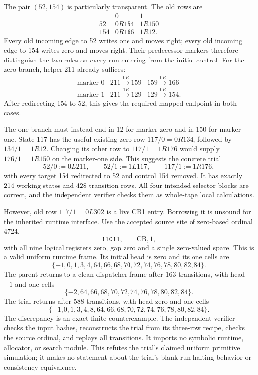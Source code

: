 The pair $(52,154)$ is particularly transparent. The old rows are
\[
\begin{array}{c|cc}
 &0&1\\\hline
52&0R154&1R150\\
154&0R166&1R12.
\end{array}
\]
Every old incoming edge to 52 writes one and moves right; every old incoming edge to 154 writes zero and moves right. Their predecessor markers therefore distinguish the two roles on every run entering from the initial control. For the zero branch, helper 211 already suffices:
\[
\begin{array}{c|cc}
\text{marker }0&211\xrightarrow{0R}159&159\xrightarrow{0R}166\\
\text{marker }1&211\xrightarrow{1R}129&129\xrightarrow{0R}154.
\end{array}
\]
After redirecting 154 to 52, this gives the required mapped endpoint in both cases.

The one branch must instead end in 12 for marker zero and in 150 for marker one. State 117 has the useful existing zero row $117/0=0R134$, followed by $134/1=1R12$. Changing its other row to $117/1=1R176$ would supply $176/1=1R150$ on the marker-one side. This suggests the concrete trial
\[
 52/0:=0L211,\qquad
 52/1:=1L117,\qquad
 117/1:=1R176,
\]
with every target 154 redirected to 52 and control 154 removed. It has exactly 214 working states and 428 transition rows. All four intended selector blocks are correct, and the independent verifier checks them as whole-tape local calculations.

However, old row $117/1=0L302$ is a live CB1 entry. Borrowing it is unsound for the inherited runtime interface. Use the accepted source site of zero-based ordinal 4724,
\[
 \texttt{11011},\qquad\mathrm{CB},1,
\]
with all nine logical registers zero, gap zero and a single zero-valued spare. This is a valid uniform runtime frame. Its initial head is zero and its one cells are
\[
 \{-1,0,1,3,4,64,66,68,70,72,74,76,78,80,82,84\}.
\]
The parent returns to a clean dispatcher frame after 163 transitions, with head $-1$ and one cells
\[
 \{-2,64,66,68,70,72,74,76,78,80,82,84\}.
\]
The trial returns after 588 transitions, with head zero and one cells
\[
 \{-1,0,1,3,4,8,64,66,68,70,72,74,76,78,80,82,84\}.
\]
The discrepancy is an exact finite counterexample. The independent verifier checks the input hashes, reconstructs the trial from its three-row recipe, checks the source ordinal, and replays all transitions. It imports no symbolic runtime, allocator, or search module. This refutes the trial's claimed uniform primitive simulation; it makes no statement about the trial's blank-run halting behavior or consistency equivalence.

